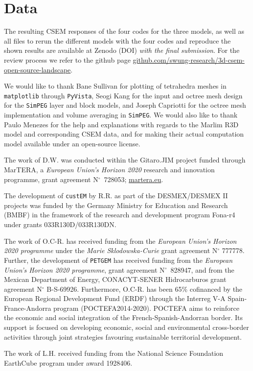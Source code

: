 \documentclass[extra, camera,%
]{gji}
\newcommand{\simpeg}{\texttt{SimPEG}\xspace}
\newcommand{\custem}{\texttt{custEM}\xspace}
\newcommand{\petgem}{\texttt{PETGEM}\xspace}
\newcommand{\itodo}[1]{\todo[color=blue!40!white, inline]{\sffamily #1}}
\begin{document}
\section{Data}
\itodo{Zenodo DOI: Upload and link here.}
The resulting CSEM responses of the four codes for the three models, as well as all files to rerun the different models with the four codes and reproduce the shown results are available at Zenodo (DOI) \emph{with the final submission}. For the review process we refer to the github page \href{https://github.com/swung-research/3d-csem-open-source-landscape}{github.com/swung-research/3d-csem-open-source-landscape}.


\begin{acknowledgments}

We would like to thank Bane Sullivan for plotting of tetrahedra meshes in \texttt{matplotlib} through \texttt{PyVista}, Seogi Kang for the input and octree mesh design for the \simpeg layer and block models, and Joseph Capriotti for the octree mesh implementation and volume averaging in \simpeg. We would also like to thank Paulo Menezes for the help and explanations with regards to the Marlim R3D model and corresponding CSEM data, and for making their actual computation model available under an open-source license.

The work of D.W. was conducted within the Gitaro.JIM project funded through MarTERA, a \emph{European Union's Horizon 2020} research and innovation programme, grant agreement N$^\circ$~728053; \href{https://www.martera.eu}{martera.eu}.

The development of \custem by R.R. as part of the DESMEX/DESMEX II projects was funded by the Germany Ministry for Education and Research (BMBF) in the framework of the research and development program Fona-r4 under grants 033R130D/033R130DN.

The work of O.C-R. has received funding from the \emph{European Union's Horizon 2020 programme} under the \emph{Marie Sklodowska-Curie} grant agreement N$^\circ$ 777778. Further, the development of \petgem has received funding from the \emph{European Union's Horizon 2020 programme}, grant agreement N$^\circ$~828947, and from the Mexican Department of Energy, CONACYT-SENER Hidrocarburos grant agreement N$^\circ$ B-S-69926. Furthermore, O.C-R. has been 65\% cofinanced by the European Regional Development Fund (ERDF) through the Interreg V-A Spain-France-Andorra program (POCTEFA2014-2020). POCTEFA aims to reinforce the economic and social integration of the French-Spanish-Andorran border. Its support is focused on developing economic, social and environmental cross-border activities through joint strategies favouring sustainable territorial development.

The work of L.H. received funding from the National Science Foundation EarthCube program under award 1928406.
\end{acknowledgments}




\label{lastpage}
\end{document}
